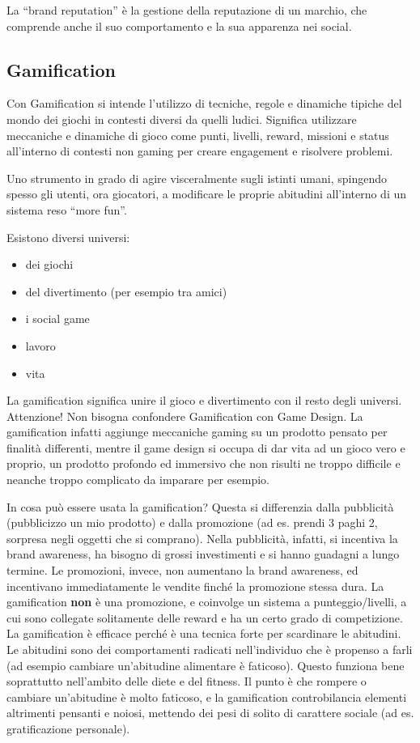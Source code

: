 La ``brand reputation'' è la gestione della reputazione di un marchio, che
comprende anche il suo comportamento e la sua apparenza nei social.

\subsection{Gamification}

Con Gamification si intende l'utilizzo di tecniche, regole e dinamiche tipiche
del mondo dei giochi in contesti diversi da quelli ludici. Significa utilizzare
meccaniche e dinamiche di gioco come punti, livelli, reward, missioni e status
all'interno di contesti non gaming per creare engagement e risolvere problemi.

Uno strumento in grado di agire visceralmente sugli istinti umani, spingendo
spesso gli utenti, ora giocatori, a modificare le proprie abitudini all’interno
di un sistema reso ``more fun''.

Esistono diversi universi:
\begin{itemize}
 \item dei giochi
 \item del divertimento (per esempio tra amici)
 \item i social game
 \item lavoro
 \item vita
\end{itemize}

La gamification significa unire il gioco e divertimento con il resto degli
universi. Attenzione! Non bisogna confondere Gamification con Game Design. La
gamification infatti aggiunge meccaniche gaming su un prodotto pensato per
finalità differenti, mentre il game design si occupa di dar vita ad un gioco
vero e proprio, un prodotto profondo ed immersivo che non risulti ne troppo
difficile e neanche troppo complicato da imparare per esempio.

In cosa può essere usata la gamification? Questa si differenzia dalla
pubblicità (pubblicizzo un mio prodotto) e dalla promozione (ad es. prendi 3
paghi 2, sorpresa negli oggetti che si comprano). Nella pubblicità, infatti, si
incentiva la brand awareness, ha bisogno di grossi investimenti e si hanno
guadagni a lungo termine. Le promozioni, invece, non aumentano la brand
awareness, ed incentivano immediatamente le vendite finché la promozione stessa
dura. La gamification \textbf{non} è una promozione, e coinvolge un sistema a
punteggio/livelli, a cui sono collegate solitamente delle reward e ha un certo
grado di competizione.
La gamification è efficace perché è una tecnica forte per scardinare le
abitudini. Le abitudini sono dei comportamenti radicati nell'individuo che è
propenso a farli (ad esempio cambiare un'abitudine alimentare è faticoso).
Questo funziona bene soprattutto nell'ambito delle diete e del fitness.
Il punto è che rompere o cambiare un'abitudine è molto faticoso, e la
gamification controbilancia elementi altrimenti pensanti e noiosi, mettendo dei
pesi di solito di carattere sociale (ad es. gratificazione personale).

